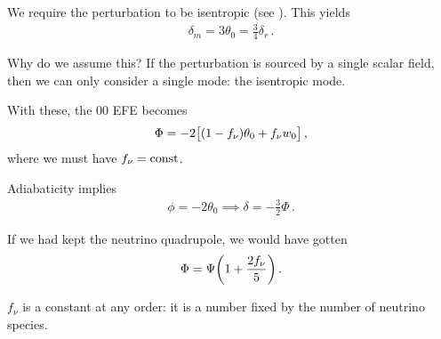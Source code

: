 \documentclass[main.tex]{subfiles}
\begin{document}
We require the perturbation to be isentropic (see \cite[]{colespCosmology2002}). This yields 
%
\begin{align}
\delta_{m} = 3 \theta_0 = \frac{3}{4} \delta_{r}
\,.
\end{align}

Why do we assume this? If the perturbation is sourced by a single scalar field, then we can only consider a single mode: the isentropic mode. 

With these, the 00 EFE becomes 
%
\begin{align}
\Phi = -2 \qty[(1- f_{\nu }) \theta_0 + f_{\nu }w_0 ]
\,,
\end{align}
%
where we must have \(f_{\nu } = \text{const}\). 

Adiabaticity implies 
%
\begin{align}
\phi = - 2 \theta_0 \implies \delta = - \frac{3}{2} \Phi 
\,.
\end{align}

If we had kept the neutrino quadrupole, we would have gotten 
%
\begin{align}
\Phi = \Psi \qty(1 + \frac{2 f_{\nu }}{5})
\,.
\end{align}

\(f_{\nu }\) is a constant at any order: it is a number fixed by the number of neutrino species. 
\end{document}
